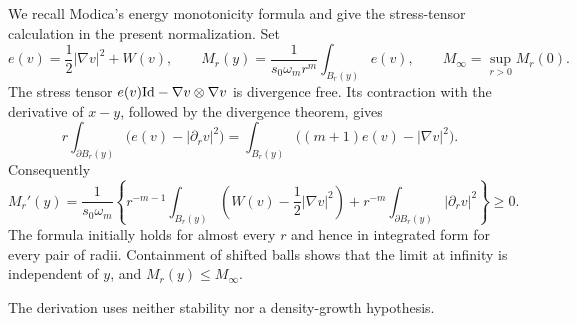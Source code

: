 We recall Modica's energy monotonicity formula \cite{Modica1989} and
give the stress-tensor calculation in the present normalization. Set
\begin{equation}\label{eq:finite-density}
 e(v)=\frac12|\nabla v|^2+W(v),\qquad
 M_r(y)=\frac{1}{s_0\omega_m r^m}\int_{B_r(y)}e(v),\qquad
 M_\infty=\sup_{r>0}M_r(0).
\end{equation}
The stress tensor
\(e(v)\mathrm{Id}-\nabla v\otimes\nabla v\) is divergence free.  Its contraction with
the derivative of \(x-y\), followed by the divergence theorem, gives
\[
 r\int_{\partial B_r(y)}\bigl(e(v)-|\partial_rv|^2\bigr)
   =\int_{B_r(y)}\bigl((m+1)e(v)-|\nabla v|^2\bigr).
\]
Consequently
\begin{equation}\label{eq:finite-monotonicity}
 M_r'(y)=\frac{1}{s_0\omega_m}
 \left\{r^{-m-1}\int_{B_r(y)}\left(W(v)-\frac12|\nabla v|^2\right)
       +r^{-m}\int_{\partial B_r(y)}|\partial_rv|^2\right\}\ge0.
\end{equation}
The formula initially holds for almost every \(r\) and hence in integrated
form for every pair of radii.  Containment of shifted balls shows that the
limit at infinity is independent of \(y\), and \(M_r(y)\le M_\infty\).

The derivation uses neither stability nor a density-growth hypothesis.

